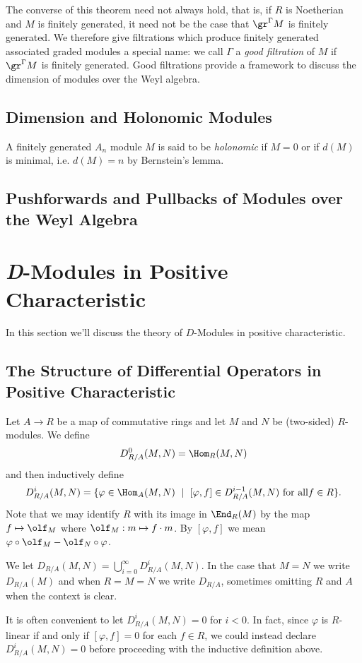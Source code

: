 The converse of this theorem need not always hold, that is, if $R$ is Noetherian and $M$ is finitely generated, it need not be the case that $\gr^{\Gamma}M$ is finitely generated. We therefore give filtrations which produce finitely generated associated graded modules a special name: we call $\Gamma$ a \emph{good filtration} of $M$ if $\gr^\Gamma M$ is finitely generated. Good filtrations provide a framework to discuss the dimension of modules over the Weyl algebra.

\subsection{Dimension and Holonomic Modules}

\begin{defn}\label{defn:holonomic}
	A finitely generated $A_n$ module $M$ is said to be \emph{holonomic} if $M = 0$ or if $d(M)$ is minimal, i.e. $d(M) = n$ by Bernstein's lemma.
\end{defn}

\subsection{Pushforwards and Pullbacks of Modules over the Weyl Algebra}

\section{\emph{D}-Modules in Positive Characteristic}
In this section we'll discuss the theory of $D$-Modules in positive characteristic. 
\subsection{The Structure of Differential Operators in Positive Characteristic}

\begin{defn}\label{defn:diff-op-rings}
	Let $A\to R$ be a map of commutative rings and let $M$ and $N$ be (two-sided) $R$-modules. We define
	\begin{align*}
		D^0_{R/A}(M,N) = \Hom_R(M,N)
	\end{align*}
	and then inductively define
	\begin{align*}
		D^i_{R/A}(M,N) = \{\varphi \in \Hom_A(M,N) ~\mid~ [\varphi,f] \in D^{i-1}_{R/A}(M,N) ~ \text{for all} f \in R\}.
	\end{align*}
    Note that we may identify $R$ with its image in $\End_R(M)$ by the map $f \mapsto \olf_M$ where $\olf_M: m\mapsto f\cdot m$. By $[\varphi,f]$ we mean $\varphi\circ \olf_M - \olf_N\circ \varphi$.

	We let $D_{R/A}(M,N) = \bigcup_{i=0}^\infty D^{i}_{R/A}(M,N)$. In the case that $M = N$ we write $D_{R/A}(M)$ and when $R = M = N$ we write $D_{R/A}$, sometimes omitting $R$ and $A$ when the context is clear.
\end{defn}
It is often convenient to let $D^i_{R/A}(M,N) = 0$ for $i < 0$. In fact, since $\varphi$ is $R$-linear if and only if $[\varphi, f] = 0$ for each $f \in R$, we could instead declare $D^i_{R/A}(M,N) = 0$ before proceeding with the inductive definition above.

